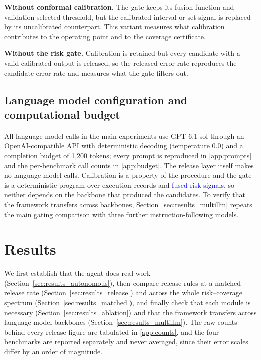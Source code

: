 \documentclass[preprint,12pt,authoryear]{elsarticle}
\begin{document}
\textbf{Without conformal calibration.}
The gate keeps its fusion function and validation-selected threshold, but the calibrated interval or set signal is replaced by its uncalibrated counterpart.
This variant measures what calibration contributes to the operating point and to the coverage certificate.

\textbf{Without the risk gate.}
Calibration is retained but every candidate with a valid calibrated output is released, so the released error rate reproduces the candidate error rate and measures what the gate filters out.


\subsection{Language model configuration and computational budget}
\label{sec:llm_configuration}


All language-model calls in the main experiments use GPT-6.1-sol through an OpenAI-compatible API with deterministic decoding (temperature 0.0) and a completion budget of 1{,}200 tokens; every prompt is reproduced in \ref{app:prompts} and the per-benchmark call counts in \ref{app:budget}.
The release layer itself makes no language-model calls. Calibration is a property of the procedure and the gate is a deterministic program over execution records and \textcolor{blue}{fused risk signals}, so neither depends on the backbone that produced the candidates.
To verify that the framework transfers across backbones, Section~\ref{sec:results_multillm} repeats the main gating comparison with three further instruction-following models.


\section{Results}
\label{sec:results}


We first establish that the agent does real work (Section~\ref{sec:results_autonomous}), then compare release rules at a matched release rate (Section~\ref{sec:results_release}) and across the whole risk--coverage spectrum (Section~\ref{sec:results_matched}), and finally check that each module is necessary (Section~\ref{sec:results_ablation}) and that the framework transfers across language-model backbones (Section~\ref{sec:results_multillm}).
The raw counts behind every release figure are tabulated in \ref{app:counts}, and the four benchmarks are reported separately and never averaged, since their error scales differ by an order of magnitude.
\end{document}
